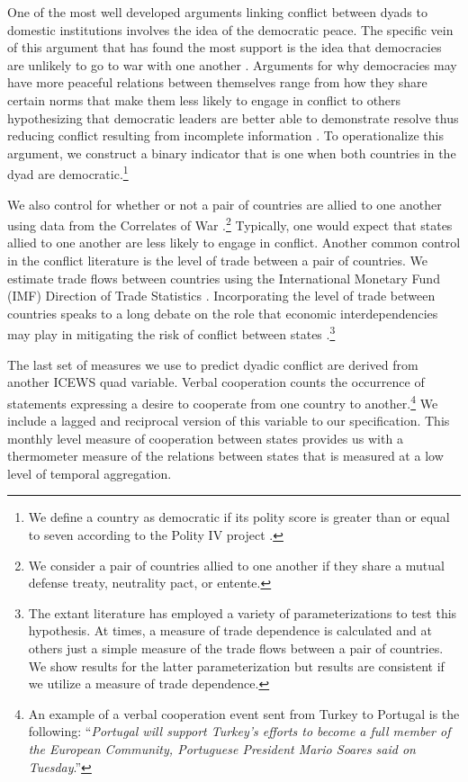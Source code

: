 One of the most well developed arguments linking conflict between dyads to domestic institutions involves the idea of the democratic peace. The specific vein of this argument that has found the most support is the idea that democracies are unlikely to go to war with one another \citep{small:singer:1976,maoz:abdolali:1989,russett:oneal:2001}. Arguments for why democracies may have more peaceful relations between themselves range from how they share certain norms that make them less likely to engage in conflict to others hypothesizing that democratic leaders are better able to demonstrate resolve thus reducing conflict resulting from incomplete information \citep{maoz:russett:1993,fearon:1995}. To operationalize this argument, we construct a binary indicator that is one when both countries in the dyad are democratic.\footnote{We define a country as democratic if its polity score is greater than or equal to seven according to the Polity IV project \citep{marshall:jaggers:2002}.}

We also control for whether or not a pair of countries are allied to one another using data from the Correlates of War \citep{gibler:sarkees:2004}.\footnote{We consider a pair of countries allied to one another if they share a mutual defense treaty, neutrality pact, or entente.} Typically, one would expect that states allied to one another are less likely to engage in conflict. Another common control in the conflict literature is the level of trade between a pair of countries. We estimate trade flows between countries using the International Monetary Fund (IMF) Direction of Trade Statistics \citep{imf:2012}. Incorporating the level of trade between countries speaks to a long debate on the role that economic interdependencies may play in mitigating the risk of conflict between states \citep{barbieri:1996,gartzke:etal:2001}.\footnote{The extant literature has employed a variety of parameterizations to test this hypothesis. At times, a measure of trade dependence is calculated and at others just a simple measure of the trade flows between a pair of countries. We show results for the latter parameterization but results are consistent if we utilize a measure of trade dependence.}

The last set of measures we use to predict dyadic conflict are derived from another ICEWS quad variable. Verbal cooperation counts the occurrence of statements expressing a desire to cooperate from one country to another.\footnote{An example of a verbal cooperation event sent from Turkey to Portugal is the following: ``\textit{Portugal will support Turkey's efforts to become a full member of the European Community, Portuguese President Mario Soares said on Tuesday}.''}  We include a lagged and reciprocal version of this variable to our specification. This monthly level measure of cooperation between states provides us with a thermometer measure of the relations between states that is measured at a low level of temporal aggregation.

